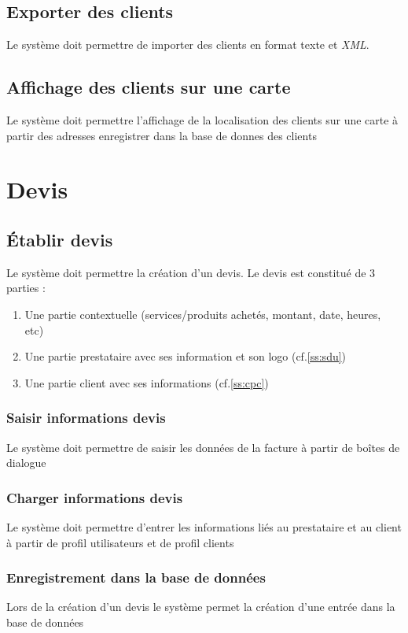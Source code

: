 \documentclass{article}
\begin{document}
    \subsection{Exporter des clients}
    Le système doit permettre de importer des clients en format texte et \emph{XML}.
    
    \subsection{Affichage des clients sur une carte}
    Le système doit permettre l'affichage de la localisation des clients sur une carte 
    à partir des adresses enregistrer dans la base de donnes des clients 


\section{Devis}
    \subsection{Établir devis}
    Le système doit permettre la création d'un devis.
    Le devis est constitué de 3 parties :
    \begin{enumerate}[leftmargin=0.55in]
    \item Une partie contextuelle (services/produits achetés, montant, date, heures, etc)
    \item Une partie prestataire avec ses information et son logo (cf.\ref{ss:sdu})
    \item Une partie client avec ses informations (cf.\ref{ss:cpc})
    \end{enumerate}
    \subsubsection{Saisir informations devis}
    Le système doit permettre de saisir les données  de la facture à partir de
    boîtes de dialogue
    \subsubsection{Charger informations devis}
    Le système doit permettre d'entrer les informations liés au prestataire et au client à partir
    de profil utilisateurs et de profil clients
    \subsubsection{Enregistrement dans la base de données}
    Lors de la création d'un devis le système permet la création d'une entrée dans la base de données
\end{document}
